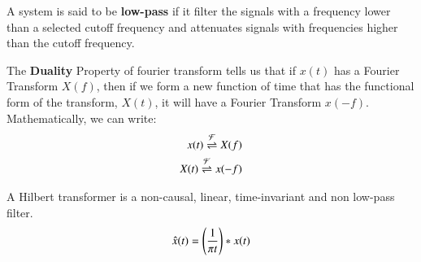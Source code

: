 \documentclass[journal,12pt,twocolumn]{IEEEtran}
\begin{document}
\begin{definition}
A system is said to be \textbf{low-pass} if it filter the signals with a frequency lower than a selected cutoff frequency and attenuates signals with frequencies higher than the cutoff frequency. \label{newdef}
\end{definition}
\begin{definition}
The \textbf{Duality} Property of fourier transform tells us that if $x(t)$ has a Fourier Transform $X(f)$, then if we form a new function of time that has the functional form of the transform, $X(t)$, it will have a Fourier Transform $x(-f)$. Mathematically, we can write:
\begin{align}
    x(t)\overset{\mathcal{F}}{ \rightleftharpoons} X(f)\\
    X(t)\overset{\mathcal{F}}{ \rightleftharpoons} x(-f)
\end{align}
\label{duality}
\end{definition}
\begin{lemma}
A Hilbert transformer is a non-causal, linear, time-invariant and non low-pass filter.
\begin{align}
     \hat{x}(t)= \left(\frac{1}{\pi t}\right)\ast x(t)
\end{align}
\end{lemma}
\end{document}
